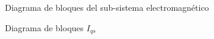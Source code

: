 \documentclass[a4paper, 10pt, onecolumn,journal]{ieeeconf}
\begin{document}
\begin{figure}[thpb]
    \centering
    \begin{adjustbox}{max width=\columnwidth}
    \end{adjustbox}
    \caption{Diagrama de bloques del sub-sistema electromagnético}
    \label{sub-sistema electromagnetico}
\end{figure}

\begin{figure}[thpb]
    \centering
    \begin{adjustbox}{max width=\columnwidth}
    \end{adjustbox}
    \caption{Diagrama de bloques $I_{qs}$}
    \label{diagrama de bloques I_qs}
\end{figure}
\end{document}
